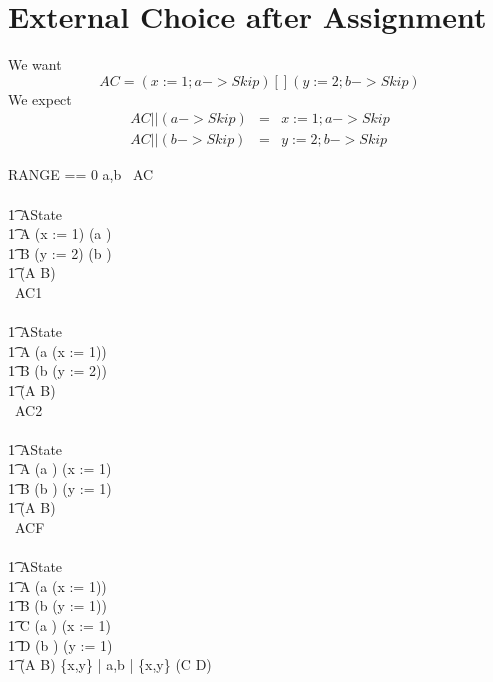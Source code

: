\section{External Choice after Assignment}

We want
\[
  AC = ( x:=1 ; a -> Skip ) [] (y:=2 ; b -> Skip)
\]
We expect
\begin{eqnarray}
   AC || (a -> Skip)  &=&  x:=1 ; a -> Skip
\\ AC || (b -> Skip)  &=&  y:=2 ; b -> Skip
\end{eqnarray}

\begin{circus}
RANGE == 0 
\also \circchannel a,b
\also
\circprocess\ AC \circdef\\
\circbegin\\
\t1 \circstate AState \\
\t1 A \circdef (x := 1) \circseq (a \then \Skip) \\
\t1 B \circdef (y := 2) \circseq (b \then \Skip) \\
\t1 \circspot (A \extchoice B)\\
\circend
\also
\circprocess\ AC1 \circdef\\
\circbegin\\
\t1 \circstate AState \\
\t1 A \circdef (a \then (x := 1))  \\
\t1 B \circdef (b \then (y := 2)) \\
\t1 \circspot (A \extchoice B)\\
\circend
\also
\circprocess\ AC2 \circdef\\
\circbegin\\
\t1 \circstate AState \\
\t1 A \circdef  (a \then \Skip) \circseq (x := 1) \\
\t1 B \circdef  (b \then \Skip) \circseq (y := 1) \\
\t1 \circspot (A \extchoice B)\\
\circend
\also
\circprocess\ ACF \circdef\\
\circbegin\\
\t1 \circstate AState \\
\t1 A \circdef  (a \then (x := 1)) \\
\t1 B \circdef  (b \then (y := 1)) \\
\t1 C \circdef  (a \then \Skip) \circseq (x := 1) \\
\t1 D \circdef  (b \then \Skip) \circseq (y := 1) \\
\t1 \circspot (A \extchoice B) \lpar \{x,y\} | \lchanset a,b \rchanset | \{x,y\} \rpar (C \extchoice D)\\
\circend
\end{circus}
